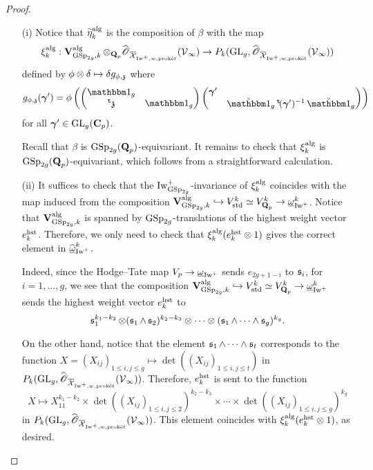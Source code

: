 \begin{proof}
\begin{enumerate}
\item[(i)] Notice that $\widetilde{\eta}^{\alg}_k$ is the composition of $\beta$ with the map 
$$
\xi_k^{\alg}: \V_{\GSp_{2g}, k}^{\alg} \otimes_{\Q_p} \widehat{\scrO}_{\overline{\calX}_{\Iw^+, w, \proket}}(\calV_{\infty})\rightarrow P_k(\GL_g, \widehat{\scrO}_{\overline{\calX}_{\Iw^+, w, \proket}}(\calV_{\infty}))
$$
defined by $\phi\otimes \delta \mapsto \delta g_{\phi,\frakz}$
where $$g_{\phi,\frakz}(\bfgamma')=\phi\left(\begin{pmatrix}\one_g& \\ \trans\frakz&\one_g\end{pmatrix}
\begin{pmatrix}\bfgamma' & \\ & \oneanti_g \trans(\bfgamma')^{-1}\oneanti_g\end{pmatrix}\right)$$
for all $\bfgamma'\in \GL_g(\C_p)$.

Recall that $\beta$ is $\GSp_{2g}(\Q_p)$-equivariant. It remains to check that $\xi^{\alg}_k$ is $\GSp_{2g}(\Q_p)$-equivariant, which follows from a straightforward calculation.

\item[(ii)] It suffices to check that the $\Iw^+_{\GSp_{2g}}$-invariance of $\xi^{\alg}_k$ coincides with the map induced from the composition $\V_{\GSp_{2g}, k}^{\alg}\hookrightarrow V_{\mathrm{std}}^k\simeq V_{\Q_p}^{k}\rightarrow  \underline{\omega}_{\Iw^+}^k$. Notice that $\V_{\GSp_{2g}, k}^{\alg}$ is spanned by $\GSp_{2g}$-translations of the highest weight vector $e^{\hst}_k$. Therefore, we only need to check that $\xi^{\alg}_k(e^{\hst}_k\otimes 1)$ gives the correct element in $\widehat{\underline{\omega}}_{\Iw^+}^k$.

Indeed, since the Hodge--Tate map $V_p\rightarrow \underline{\omega}_{\Iw^+}$ sends $e_{2g+1-i}$ to $\fraks_i$, for $i=1, \ldots, g$, we see that the composition $\V_{\GSp_{2g}, k}^{\alg}\hookrightarrow V_{\mathrm{std}}^k\simeq V_{\Q_p}^{k}\rightarrow  \underline{\omega}_{\Iw^+}^k$ sends the highest weight vector $e^{\hst}_k$ to 
$$\fraks_1^{k_1-k_2}\otimes (\fraks_1\wedge \fraks_2)^{k_2-k_3}\otimes \cdots\otimes (\fraks_1\wedge\cdots\wedge \fraks_g)^{k_g}.$$

On the other hand, notice that the element $\fraks_1\wedge\cdots \wedge \fraks_t$ corresponds to the function $X = (X_{ij})_{1\leq i,j\leq g}\mapsto \det((X_{ij})_{1\leq i,j\leq t})$ in $P_k(\GL_g, \widehat{\scrO}_{\overline{\calX}_{\Iw^+, w, \proket}}(\calV_{\infty}))$. Therefore, $e^{\hst}_k$ is sent to the function
$$X \mapsto X_{11}^{k_1-k_2}\times \det((X_{ij})_{1\leq i,j\leq 2})^{k_2-k_3}\times\cdots \times\det((X_{ij})_{1\leq i,j\leq g})^{k_g}$$
in $P_k(\GL_g, \widehat{\scrO}_{\overline{\calX}_{\Iw^+, w, \proket}}(\calV_{\infty}))$. This element coincides with $\xi^{\alg}_k(e^{\hst}_k\otimes 1)$, as desired.
\end{enumerate}
\end{proof}

